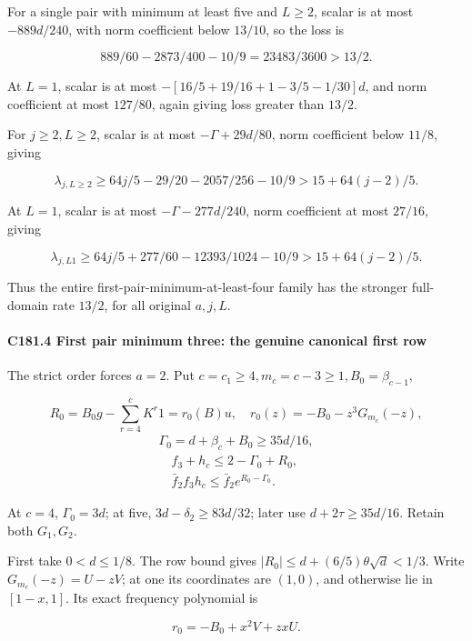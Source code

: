 For a single pair with minimum at least five and \(L\ge2\), scalar is at most \(-889d/240\), with norm coefficient below \(13/10\), so the loss is

\[
889/60-2873/400-10/9=23483/3600>13/2.
\]

At \(L=1\), scalar is at most \(-[16/5+19/16+1-3/5-1/30]d\), and norm coefficient at most \(127/80\), again giving loss greater than \(13/2\).

For \(j\ge2,\allowbreak \allowbreak  L\ge2\), scalar is at most \(-\Gamma+29d/80\), norm coefficient below \(11/8\), giving

\[
\lambda_{j,L\ge2}\ge64j/5-29/20-2057/256-10/9
>15+64(j-2)/5.
\]

At \(L=1\), scalar is at most \(-\Gamma-277d/240\), norm coefficient at most \(27/16\), giving

\[
\lambda_{j,L1}\ge64j/5+277/60-12393/1024-10/9
>15+64(j-2)/5.
\]

Thus the entire first-pair-minimum-at-least-four family has the stronger full-domain rate \(13/2\), for all original \(a,\allowbreak \allowbreak  j,\allowbreak \allowbreak  L\).

\paragraph{C181.4 First pair minimum three: the genuine canonical first row}

The strict order forces \(a=2\). Put \(c=c_1\ge4,\allowbreak \allowbreak  m_c=c-3\ge1,\allowbreak \allowbreak  B_0=\beta_{c-1}\),

\[
R_0=B_0g-\sum_{r=4}^cK^r1=r_0(B)u,
\quad r_0(z)=-B_0-z^3G_{m_c}(-z),
\]
\[
\begin{gathered}
\Gamma_0=d+\beta_c+B_0\ge35d/16,\\
\quad f_3+h_c\le2-\Gamma_0+R_0,\\
\quad \bar f_2f_3h_c\le \bar f_2e^{R_0-\Gamma_0}.
\end{gathered}\tag{C181.T190.18}
\]

At \(c=4\), \(\Gamma_0=3d\); at five, \(3d-\delta_2\ge83d/32\); later use \(d+2\tau\ge35d/16\). Retain both \(G_1,\allowbreak \allowbreak  G_2\).

First take \(0<d\le1/8\). The row bound gives \(|R_0|\le d+(6/5)\theta\sqrt d<1/3\). Write \(G_{m_c}(-z)=U-zV\); at one its coordinates are \((1,\allowbreak \allowbreak  0)\), and otherwise lie in \([1-x,\allowbreak \allowbreak  1]\). Its exact frequency polynomial is

\[
r_0=-B_0+x^2V+zxU.
\tag{C181.T190.19}
\]

